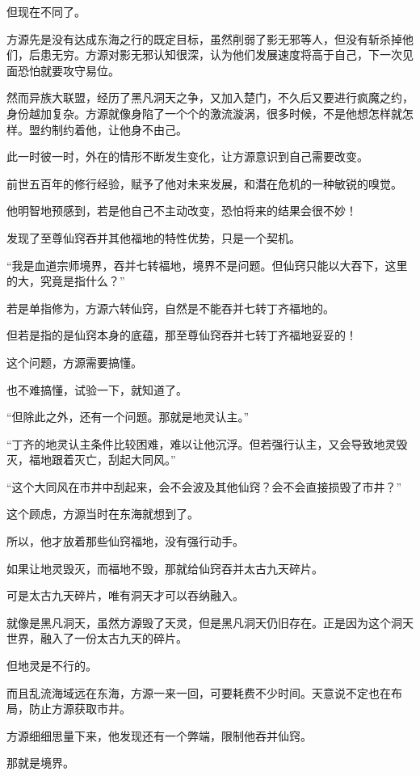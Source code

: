\begin{this_body}
但现在不同了。

方源先是没有达成东海之行的既定目标，虽然削弱了影无邪等人，但没有斩杀掉他们，后患无穷。方源对影无邪认知很深，认为他们发展速度将高于自己，下一次见面恐怕就要攻守易位。

然而异族大联盟，经历了黑凡洞天之争，又加入楚门，不久后又要进行疯魔之约，身份越加复杂。方源就像身陷了一个个的激流漩涡，很多时候，不是他想怎样就怎样。盟约制约着他，让他身不由己。

此一时彼一时，外在的情形不断发生变化，让方源意识到自己需要改变。

前世五百年的修行经验，赋予了他对未来发展，和潜在危机的一种敏锐的嗅觉。

他明智地预感到，若是他自己不主动改变，恐怕将来的结果会很不妙！

发现了至尊仙窍吞并其他福地的特性优势，只是一个契机。

“我是血道宗师境界，吞并七转福地，境界不是问题。但仙窍只能以大吞下，这里的大，究竟是指什么？”

若是单指修为，方源六转仙窍，自然是不能吞并七转丁齐福地的。

但若是指的是仙窍本身的底蕴，那至尊仙窍吞并七转丁齐福地妥妥的！

这个问题，方源需要搞懂。

也不难搞懂，试验一下，就知道了。

“但除此之外，还有一个问题。那就是地灵认主。”

“丁齐的地灵认主条件比较困难，难以让他沉浮。但若强行认主，又会导致地灵毁灭，福地跟着灭亡，刮起大同风。”

“这个大同风在市井中刮起来，会不会波及其他仙窍？会不会直接损毁了市井？”

这个顾虑，方源当时在东海就想到了。

所以，他才放着那些仙窍福地，没有强行动手。

如果让地灵毁灭，而福地不毁，那就给仙窍吞并太古九天碎片。

可是太古九天碎片，唯有洞天才可以吞纳融入。

就像是黑凡洞天，虽然方源毁了天灵，但是黑凡洞天仍旧存在。正是因为这个洞天世界，融入了一份太古九天的碎片。

但地灵是不行的。

而且乱流海域远在东海，方源一来一回，可要耗费不少时间。天意说不定也在布局，防止方源获取市井。

方源细细思量下来，他发现还有一个弊端，限制他吞并仙窍。

那就是境界。


\end{this_body}
